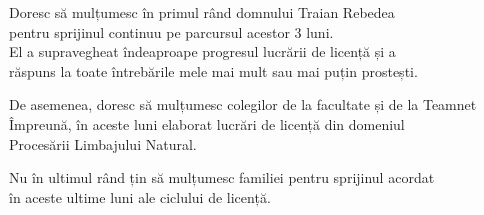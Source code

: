 \vspace*{7cm}
\begin{center}
Doresc să mulțumesc în primul rând domnului Traian Rebedea\\
pentru sprijinul continuu pe parcursul acestor 3 luni.\\
El a supravegheat îndeaproape progresul lucrării de licență și a\\
răspuns la toate întrebările mele mai mult sau mai puțin prostești.
\end{center}

\vspace{0.6cm}
\begin{center}
De asemenea, doresc să mulțumesc colegilor de la facultate și de la Teamnet\\
Împreună, în aceste luni elaborat lucrări de licență din domeniul\\
Procesării Limbajului Natural.
\end{center}


\vspace{0.6cm}
\begin{center}
Nu în ultimul rând țin să mulțumesc familiei pentru sprijinul acordat\\
în aceste ultime luni ale ciclului de licență.
\end{center}

